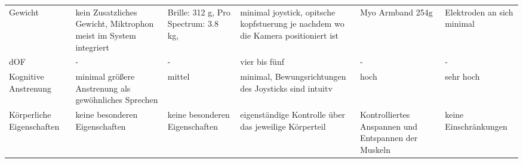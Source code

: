 \begin{landscape}
\begin{longtable}{|p{3cm}|p{3cm}|p{3cm}|p{3cm}|p{3cm}|p{3cm}|}
Gewicht                   & kein Zusatzliches Gewicht, Miktrophon meist im System integriert                                                            & Brille: 312 g, Pro Spectrum: 3.8 kg,                                                                                                         & minimal joystick, opitsche kopfstuerung je nachdem wo die Kamera positioniert ist                            & Myo Armband 254g                                                                         & Elektroden an sich minimal                                                                                              \\
dOF                       & -                                                                                                                           & -                                                                                                                                            & vier bis fünf                                                                                                & -                                                                                        & -                                                                                                                       \\
Kognitive Anstrenung      & minimal größere Anstrenung als gewöhnliches Sprechen                                                                        & mittel                                                                                                                                       & minimal, Bewungsrichtungen des Joysticks sind intuitv                                                        & hoch                                                                                     & sehr hoch                                                                                                               \\
Körperliche Eigenschaften & keine besonderen Eigenschaften                                                                                              & keine besonderen Eigenschaften                                                                                                               & eigenständige Kontrolle über das jeweilige Körperteil                                                        & Kontrolliertes Anspannen und Entspannen der Muskeln                                      & keine Einschränkungen                                                                                                   \\

\end{longtable}
\end{landscape}
